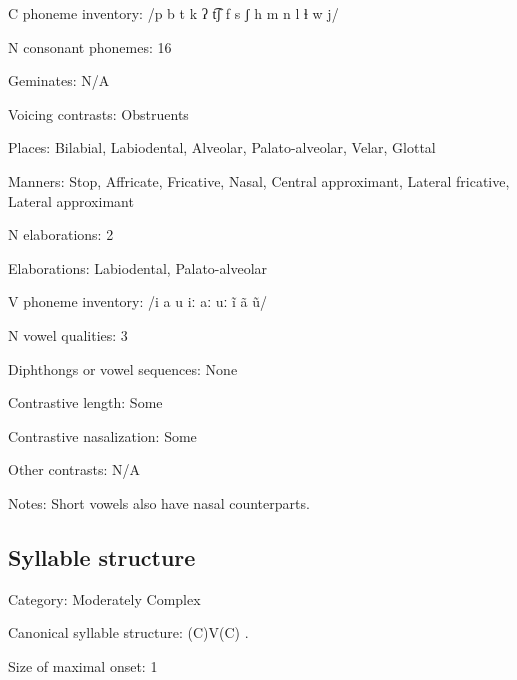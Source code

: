 {\begin{appendixdesc}
\item[C phoneme inventory:] /p b t k ʔ t͡ʃ f s ʃ h m n l ɬ w j/

\item[N consonant phonemes:] 16

\item[Geminates:] N/A

\item[Voicing contrasts:] Obstruents

\item[Places:] Bilabial, Labiodental, Alveolar, Palato-alveolar, Velar, Glottal

\item[Manners:] Stop, Affricate, Fricative, Nasal, Central approximant, Lateral fricative, Lateral approximant

\item[N elaborations:] 2

\item[Elaborations:] Labiodental, Palato-alveolar

\item[V phoneme inventory:] /i a u iː aː uː ĩ ã ũ/

\item[N vowel qualities:] 3

\item[Diphthongs or vowel sequences:] None

\item[Contrastive length:] Some

\item[Contrastive nasalization:] Some

\item[Other contrasts:] N/A

\item[Notes:] Short vowels also have nasal counterparts.
\end{appendixdesc}
\subsection*{Syllable structure}
\begin{appendixdesc}

\item[Category:] Moderately Complex

\item[Canonical syllable structure:] (C)V(C) \citep[18--21]{Broadwell2006}.

\item[Size of maximal onset:] 1


\end{appendixdesc}}
